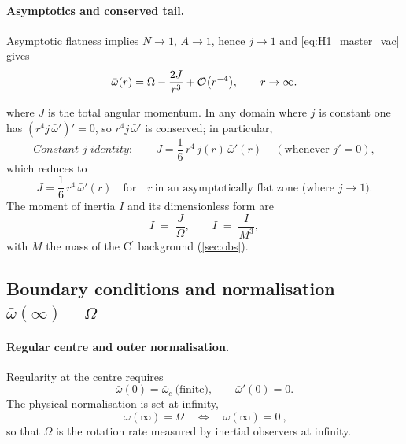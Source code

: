 \documentclass{iopjournal}
\begin{document}
\paragraph{Asymptotics and conserved tail.}
Asymptotic flatness implies $N\to1$, $A\to1$, hence $j\to1$ and \eqref{eq:H1_master_vac} gives
\begin{equation}
\bar{\omega}(r)
= \Omega - \frac{2J}{r^{3}} + \order{r^{-4}},
\qquad r \to \infty .
\label{eq:H1_asymp}
\end{equation}

where $J$ is the total angular momentum. In any domain where $j$ is constant one has $(r^{4}j\,\bar\omega')' = 0$, so $r^{4}j\,\bar\omega'$ is conserved; in particular,
\begin{equation}
\textit{Constant-}j\textit{ identity:}\qquad
\boxed{\,J=\frac{1}{6}\,r^{4}\,j(r)\,\bar\omega'(r)\,}\quad(\text{whenever }j'=0),
\label{eq:H1_constjJ}
\end{equation}
which reduces to
\begin{equation}
\boxed{\;J=\frac{1}{6}\,r^{4}\,\bar\omega'(r)\quad\text{for}\quad r\ \text{in an asymptotically flat zone (where }j\to1).\;}
\label{eq:H1_tailJ}
\end{equation}
The moment of inertia $I$ and its dimensionless form are
\begin{equation}
I\;=\;\frac{J}{\Omega},\qquad \bar I\;=\;\frac{I}{M^{3}},
\label{eq:H1_Idefs}
\end{equation}
with $M$ the mass of the C$^\prime$ background (\cref{sec:obs}).

\subsection{\texorpdfstring{Boundary conditions and normalisation $\bar\omega(\infty)=\Omega$}{Boundary conditions and normalisation bar-omega(infinity) = Omega}}\label{app:H2}
\paragraph{Regular centre and outer normalisation.}
Regularity at the centre requires
\begin{equation}
\bar\omega(0)=\bar\omega_c\ \text{(finite)},\qquad \bar\omega'(0)=0.
\label{eq:H2_center}
\end{equation}
The physical normalisation is set at infinity,
\begin{equation}
\boxed{\ \bar\omega(\infty)=\Omega\quad\Longleftrightarrow\quad \omega(\infty)=0\ },
\label{eq:H2_norm}
\end{equation}
so that $\Omega$ is the rotation rate measured by inertial observers at infinity.
\end{document}
